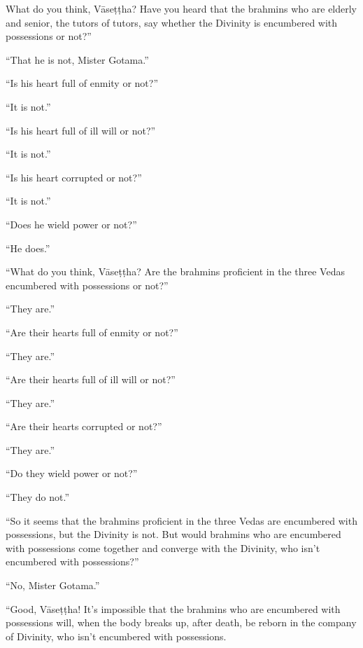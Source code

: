 \documentclass[12pt,openany]{book}%
\begin{document}
What do you think, \textsanskrit{Vāseṭṭha}? Have you heard that the brahmins who are elderly and senior, the tutors of tutors, say whether the Divinity is encumbered with possessions or not?” 

“That he is not, Mister Gotama.” 

“Is his heart full of enmity or not?” 

“It is not.” 

“Is his heart full of ill will or not?” 

“It is not.” 

“Is his heart corrupted or not?” 

“It is not.” 

“Does he wield power or not?” 

“He does.” 

“What do you think, \textsanskrit{Vāseṭṭha}? Are the brahmins proficient in the three Vedas encumbered with possessions or not?” 

“They are.” 

“Are their hearts full of enmity or not?” 

“They are.” 

“Are their hearts full of ill will or not?” 

“They are.” 

“Are their hearts corrupted or not?” 

“They are.” 

“Do they wield power or not?” 

“They do not.” 

“So it seems that the brahmins proficient in the three Vedas are encumbered with possessions, but the Divinity is not. But would brahmins who are encumbered with possessions come together and converge with the Divinity, who isn’t encumbered with possessions?” 

“No, Mister Gotama.” 

“Good, \textsanskrit{Vāseṭṭha}! It’s impossible that the brahmins who are encumbered with possessions will, when the body breaks up, after death, be reborn in the company of Divinity, who isn’t encumbered with possessions. 
\end{document}
